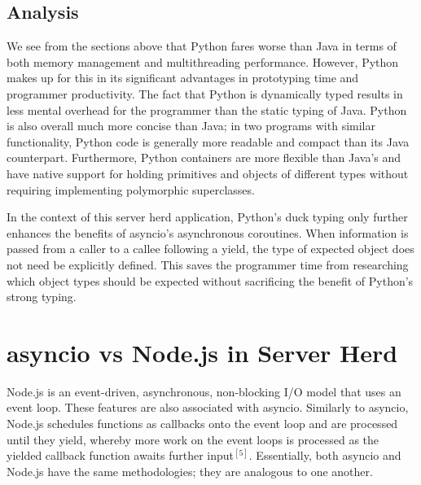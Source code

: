 \subsection{Analysis}

We see from the sections above that Python fares worse than Java in terms of both memory management and multithreading performance. However, Python makes up for this in its significant advantages in prototyping time and programmer productivity. The fact that Python is dynamically typed results in less mental overhead for the programmer than the static typing of Java. Python is also overall much more concise than Java; in two programs with similar functionality, Python code is generally more readable and compact than its Java counterpart. Furthermore, Python containers are more flexible than Java's and have native support for holding primitives and objects of different types without requiring implementing polymorphic superclasses.

In the context of this server herd application, Python's duck typing only further enhances the benefits of asyncio's asynchronous coroutines. When information is passed from a caller to a callee following a yield, the type of expected object does not need be explicitly defined. This saves the programmer time from researching which object types should be expected without sacrificing the benefit of Python's strong typing.

\section{asyncio vs Node.js in Server Herd}

Node.js is an event-driven, asynchronous, non-blocking I/O model that uses an event loop. These features are also associated with asyncio. Similarly to asyncio, Node.js schedules functions as callbacks onto the event loop and are processed until they yield, whereby more work on the event loops is processed as the yielded callback function awaits further input$^{[5]}$. Essentially, both asyncio and Node.js have the same methodologies; they are analogous to one another. 

